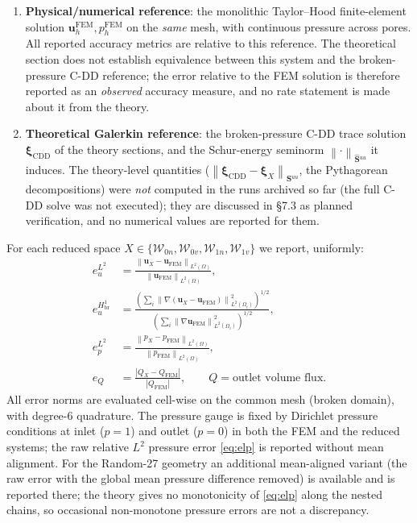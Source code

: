 \documentclass[11pt,a4paper]{article}
\newcommand{\dom}{\Omega}
\newcommand{\pore}[1]{\Omega_{#1}}
\newcommand{\vel}{\bm{u}}
\newcommand{\pres}{p}
\newcommand{\Schur}{\mathbf{S}}
\newcommand{\Shatuu}{\widehat{\Schur}{}^{uu}}
\newcommand{\Wspace}{\mathcal{W}}
\newcommand{\xiX}[1]{\bm{\xi}_{#1}}
\newcommand{\norm}[1]{\left\|#1\right\|}
\newcommand{\abs}[1]{\left|#1\right|}
\begin{document}
\begin{enumerate}[label=(\roman*),nosep,leftmargin=*]
\item \textbf{Physical/numerical reference}: the monolithic Taylor--Hood
  finite-element solution
  $\vel_h^{\mathrm{FEM}}, \pres_h^{\mathrm{FEM}}$ on the \emph{same}
  mesh, with continuous pressure across pores.  All reported accuracy
  metrics are relative to this reference.  The theoretical section does
  not establish equivalence between this system and the broken-pressure
  C-DD reference; the error relative to the FEM solution is therefore
  reported as an \emph{observed} accuracy measure, and no rate statement
  is made about it from the theory.
\item \textbf{Theoretical Galerkin reference}: the broken-pressure C-DD
  trace solution $\xiX{\mathrm{CDD}}$ of the theory sections, and the
  Schur-energy seminorm $\norm{\cdot}_{\Shatuu}$ it induces.  The
  theory-level quantities ($\norm{\xiX{\mathrm{CDD}}-\xiX{X}}_{\Shatuu}$,
  the Pythagorean decompositions) were \emph{not} computed in the runs
  archived so far (the full C-DD solve was not executed); they are
  discussed in \S7.3 as planned verification, and no numerical values
  are reported for them.
\end{enumerate}

For each reduced space $X \in \{\Wspace_{0n}, \Wspace_{0v},
\Wspace_{1n}, \Wspace_{1v}\}$ we report, uniformly:
\begin{align}
  e_u^{L^2} &= \frac{\norm{\vel_X - \vel_{\mathrm{FEM}}}_{L^2(\dom)}}
                   {\norm{\vel_{\mathrm{FEM}}}_{L^2(\dom)}}, \label{eq:elu}\\
  e_u^{H^1_{\mathrm{br}}} &= \frac{
      \left(\sum_i \norm{\nabla(\vel_X-\vel_{\mathrm{FEM}})}_{L^2(\pore{i})}^2\right)^{1/2}}
      {\left(\sum_i \norm{\nabla \vel_{\mathrm{FEM}}}_{L^2(\pore{i})}^2\right)^{1/2}},
      \label{eq:ehu}\\
  e_p^{L^2} &= \frac{\norm{\pres_X - \pres_{\mathrm{FEM}}}_{L^2(\dom)}}
                   {\norm{\pres_{\mathrm{FEM}}}_{L^2(\dom)}}, \label{eq:elp}\\
  e_Q &= \frac{\abs{Q_X - Q_{\mathrm{FEM}}}}{\abs{Q_{\mathrm{FEM}}}},
       \qquad Q = \text{outlet volume flux}. \label{eq:eq}
\end{align}
All error norms are evaluated cell-wise on the common mesh (broken
domain), with degree-6 quadrature.  The pressure gauge is fixed by
Dirichlet pressure conditions at inlet ($p=1$) and outlet ($p=0$) in
both the FEM and the reduced systems; the raw relative $L^2$ pressure
error \eqref{eq:elp} is reported without mean alignment.  For the
Random-27 geometry an additional mean-aligned variant (the raw error
with the global mean pressure difference removed) is available and is
reported there; the theory gives no monotonicity of \eqref{eq:elp}
along the nested chains, so occasional non-monotone pressure errors
are not a discrepancy.
\end{document}
